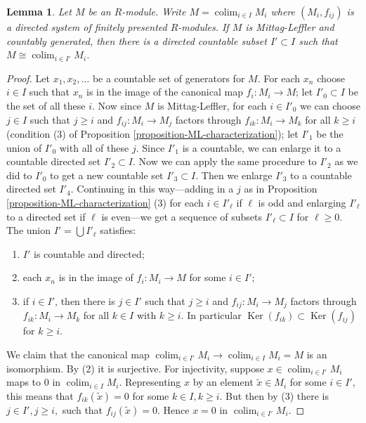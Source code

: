 \documentclass{amsart}
\theoremstyle{plain}
\newtheorem{lemma}[subsection]{Lemma}
\theoremstyle{definition}
\theoremstyle{remark}
\numberwithin{equation}{subsection}
\def\colim{\mathop{\mathrm{colim}}\nolimits}
\def\Ker{\mathop{\mathrm{Ker}}}
\begin{document}
\begin{lemma}
\label{lemma-ML-countable-colimit}
Let $M$ be an $R$-module.  Write $M = \colim_{i \in I} M_i$ where $(M_i,
f_{ij})$ is a directed system of finitely presented $R$-modules.  If $M$ is
Mittag-Leffler and countably generated, then there is a directed countable
subset $I' \subset I$ such that $M \cong \colim_{i \in I'} M_i$.
\end{lemma}

\begin{proof}
Let $x_1, x_2, \ldots$ be a countable set of generators for $M$.  For each $x_n$
choose $i \in I$ such that $x_n$ is in the image of the canonical map $f_i:
M_i \to M$; let $I'_{0} \subset I$ be the set of all these $i$.  Now
since $M$ is Mittag-Leffler, for each $i \in I'_{0}$ we can choose $j \in I$
such that $j \geq i$ and $f_{ij}: M_i \to M_j$ factors through
$f_{ik}: M_i \to M_k$ for all $k \geq i$  (condition (3) of Proposition
\ref{proposition-ML-characterization}); let $I'_1$ be the union of $I'_0$ with
all of these $j$.  Since $I'_1$ is a countable, we can enlarge it to a
countable directed set $I'_{2} \subset I$.  Now we can apply the same procedure
to $I'_{2}$ as we did to $I'_{0}$ to get a new countable set $I'_{3} \subset
I$.  Then we enlarge $I'_{3}$ to a countable directed set $I'_{4}$.  Continuing
in this way---adding in a $j$ as in Proposition
\ref{proposition-ML-characterization} (3) for each $ i \in I'_{\ell}$ if $\ell$
is odd and enlarging $I'_{\ell}$ to a directed set if $\ell$ is even---we get a
sequence of subsets $I'_{\ell} \subset I$ for $\ell \geq 0$.  The union $I' =
\bigcup I'_{\ell}$ satisfies:
\begin{enumerate}
\item $I'$ is countable and directed;
\item each $x_n$ is in the image of $f_i: M_i \to M$ for some $i
\in I'$;
\item if $i \in I'$, then there is $j \in I'$ such that $j \geq i$ and $f_{ij}:
M_i \to M_j$ factors through $f_{ik}: M_i \to M_k$ for all
$k \in I$ with $k \geq i$.  In particular $\Ker(f_{ik}) \subset \Ker(f_{ij})$
for $k \geq i$.
\end{enumerate}
We claim that the canonical map $\colim_{i \in I'} M_i \to
\colim_{i
\in I} M_i = M$ is an isomorphism.  By (2) it is surjective.  For injectivity,
suppose $x \in \colim_{i \in I'} M_i$ maps to $0$ in $\colim_{i \in
I} M_i$.
Representing $x$ by an element $\tilde{x} \in M_i$ for some $i \in I'$, this
means that $f_{ik}(\tilde{x}) = 0$ for some $k \in I, k \geq i$.  But then by
(3) there is $j \in I', j \geq i,$ such that $f_{ij}(\tilde{x}) = 0$.  Hence $x
= 0$ in $\colim_{i \in I'} M_i$.
\end{proof}
\end{document}
